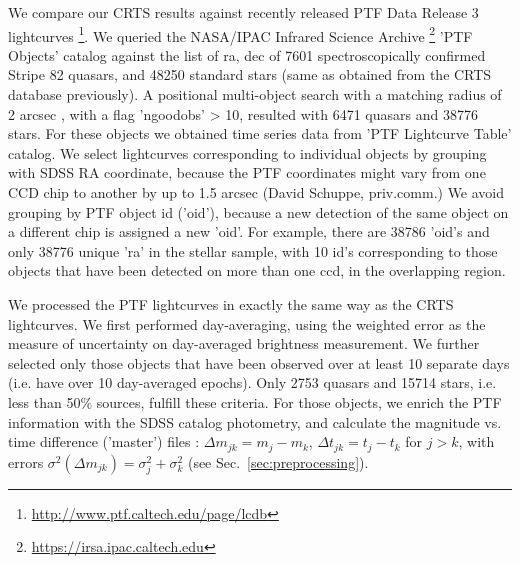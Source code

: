 \documentclass[fleqn,usenatbib]{mnras}  %
\begin{document}
We compare our CRTS results against recently released  PTF Data Release 3 lightcurves \footnote{\url{http://www.ptf.caltech.edu/page/lcdb}}. We queried the NASA/IPAC Infrared Science Archive \footnote{\url{https://irsa.ipac.caltech.edu}} 'PTF Objects' catalog against the list of ra, dec of 7601 spectroscopically confirmed Stripe 82 quasars, and 48250 standard stars (same as obtained from the CRTS database previously).  A positional multi-object search with a matching radius of 2 arcsec , with  a flag 'ngoodobs' > 10,  resulted with  6471 quasars and 38776 stars.  For these objects we obtained time series data from 'PTF Lightcurve Table' catalog.  We select lightcurves corresponding to individual objects by grouping with SDSS  RA coordinate, because the PTF coordinates might vary from  one CCD chip to another by up to 1.5 arcsec (David Schuppe, priv.comm.)  We avoid grouping by PTF object id ('oid'), because a new detection of the same object on a different chip is assigned a new 'oid'. For example, there  are 38786 'oid's  and only 38776  unique 'ra'  in the stellar sample, with 10  id's  corresponding to those objects that  have been detected on more than one ccd, in the overlapping region. 

We processed the PTF lightcurves in exactly the same way as the CRTS lightcurves. We first performed day-averaging, using the weighted error as the measure of uncertainty on day-averaged  brightness measurement. We further selected only those objects that have been observed over at least 10 separate days (i.e. have over 10 day-averaged epochs). Only 2753 quasars and 15714 stars, i.e. less than 50\% sources, fulfill these criteria.  For those objects, we enrich the PTF information with the SDSS catalog photometry, and calculate the magnitude vs. time difference ('master') files : $\Delta m_{jk} = m_{j} - m_{k}$, $\Delta t_{jk} = t_{j} - t_{k}$ for $j>k$, with errors  $\sigma^{2} (\Delta m_{jk})= \sigma_{j}^{2} + \sigma_{k}^{2}$ (see Sec.~\ref{sec:preprocessing}).
\end{document}
